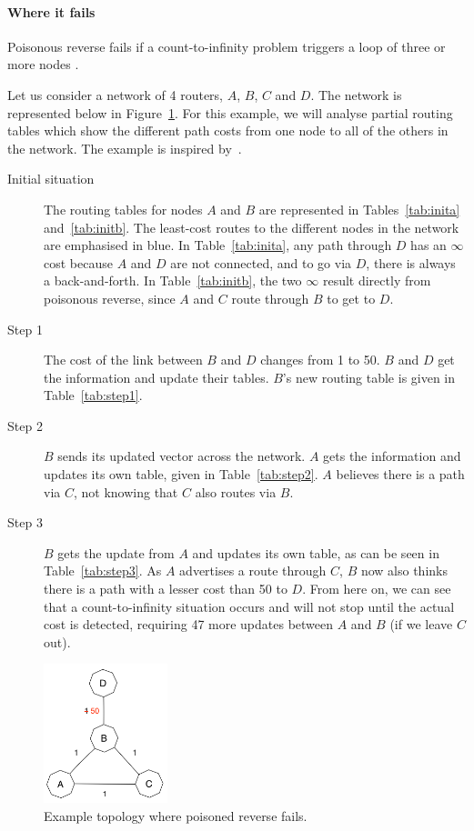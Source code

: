 \documentclass[12pt,a4paper]{article}
\begin{document}
\paragraph{Where it fails}
Poisonous reverse fails if a count-to-infinity problem triggers a loop of three or more nodes \cite[p.~378]{cn}.

Let us consider a network of 4 routers, $A$, $B$, $C$ and $D$. The network is represented below in Figure~\ref{fig:fail}. For this example, we will analyse partial routing tables which show the different path costs from one node to all of the others in the network. The example is inspired by~\cite{berkeley}.

\begin{description}
\item[Initial situation] The routing tables for nodes $A$ and $B$ are represented in Tables~\ref{tab:inita} and~\ref{tab:initb}. The least-cost routes to the different nodes in the network are emphasised in blue. In Table~\ref{tab:inita}, any path through $D$ has an $\infty$ cost because $A$ and $D$ are not connected, and to go via $D$, there is always a back-and-forth. In Table~\ref{tab:initb}, the two $\infty$ result directly from poisonous reverse, since $A$ and $C$ route through $B$ to get to $D$.

\item[Step 1] The cost of the link between $B$ and $D$ changes from 1 to 50. $B$ and $D$ get the information and update their tables. $B$'s new routing table is given in Table~\ref{tab:step1}.

\item[Step 2] $B$ sends its updated vector across the network. $A$ gets the information and updates its own table, given in Table~\ref{tab:step2}. $A$ believes there is a path via $C$, not knowing that $C$ also routes via $B$.

\item[Step 3] $B$ gets the update from $A$ and updates its own table, as can be seen in Table~\ref{tab:step3}. As $A$ advertises a route through $C$, $B$ now also thinks there is a path with a lesser cost than 50 to $D$. From here on, we can see that a count-to-infinity situation occurs and will not stop until the actual cost is detected, requiring 47 more updates between $A$ and $B$ (if we leave $C$ out).
\end{description}

\begin{figure}[!ht]
\centering
\includegraphics[width=0.32\textwidth]{Fail.png}
\caption{Example topology where poisoned reverse fails.}
\label{fig:fail}
\end{figure}
\end{document}

